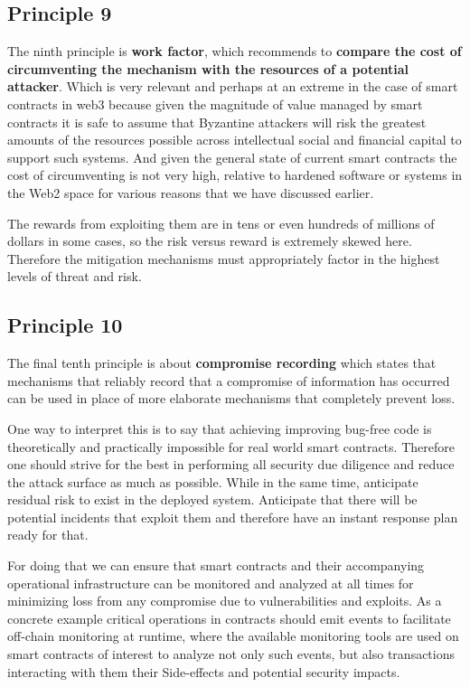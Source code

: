\subsection{Principle 9}\label{principle-9}

The ninth principle is \textbf{work factor}, which recommends to
\textbf{compare the cost of circumventing the mechanism with the
resources of a potential attacker}. Which is very relevant and perhaps
at an extreme in the case of smart contracts in web3 because given the
magnitude of value managed by smart contracts it is safe to assume that
Byzantine attackers will risk the greatest amounts of the resources
possible across intellectual social and financial capital to support
such systems. And given the general state of current smart contracts the
cost of circumventing is not very high, relative to hardened software or
systems in the Web2 space for various reasons that we have discussed
earlier.

The rewards from exploiting them are in tens or even hundreds of
millions of dollars in some cases, so the risk versus reward is
extremely skewed here. Therefore the mitigation mechanisms must
appropriately factor in the highest levels of threat and risk.

\subsection{Principle 10}\label{principle-10}

The final tenth principle is about \textbf{compromise recording} which
states that mechanisms that reliably record that a compromise of
information has occurred can be used in place of more elaborate
mechanisms that completely prevent loss.

One way to interpret this is to say that achieving improving bug-free
code is theoretically and practically impossible for real world smart
contracts. Therefore one should strive for the best in performing all
security due diligence and reduce the attack surface as much as
possible. While in the same time, anticipate residual risk to exist in
the deployed system. Anticipate that there will be potential incidents
that exploit them and therefore have an instant response plan ready for
that.

For doing that we can ensure that smart contracts and their accompanying
operational infrastructure can be monitored and analyzed at all times
for minimizing loss from any compromise due to vulnerabilities and
exploits. As a concrete example critical operations in contracts should
emit events to facilitate off-chain monitoring at runtime, where the
available monitoring tools are used on smart contracts of interest to
analyze not only such events, but also transactions interacting with
them their Side-effects and potential security impacts.
